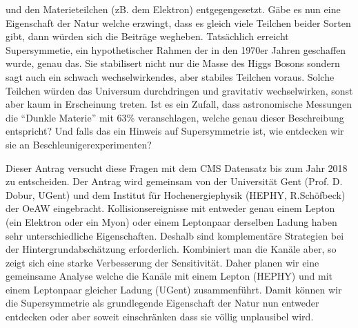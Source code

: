 \documentclass[11pt,a4paper]{article}
\begin{document}
und den Materieteilchen (zB. dem Elektron) entgegengesetzt. G\"abe es nun eine Eigenschaft der Natur welche erzwingt, dass es gleich viele Teilchen beider Sorten gibt, dann
w\"urden sich die Beitr\"age wegheben. Tats\"achlich erreicht Supersymmetie, ein hypothetischer Rahmen der in den 1970er Jahren geschaffen wurde, genau das. 
Sie stabilisert nicht nur die Masse des Higgs Bosons sondern sagt auch ein schwach wechselwirkendes, aber stabiles Teilchen voraus. Solche Teilchen w\"urden
das Universum durchdringen und gravitativ wechselwirken, sonst aber kaum in Erscheinung treten. Ist es ein Zufall, dass astronomische Messungen die ``Dunkle Materie'' mit 63\% veranschlagen,
welche genau dieser Beschreibung entspricht? Und falls das ein Hinweis auf Supersymmetrie ist, wie entdecken wir sie an Beschleunigerexperimenten?

Dieser Antrag versucht diese Fragen mit dem CMS Datensatz bis zum Jahr 2018 zu entscheiden. Der Antrag wird gemeinsam von der Universit\"at Gent (Prof. D. Dobur, UGent) und dem
Institut f\"ur Hochenergiephysik (HEPHY, R.Sch\"ofbeck) der OeAW eingebracht. Kollisionsereignisse mit entweder genau einem Lepton (ein Elektron oder ein Myon) oder
einem Leptonpaar derselben Ladung haben sehr unterschiedliche Eigenschaften. Deshalb sind komplement\"are Strategien bei der Hintergrundabsch\"atzung erforderlich.
Kombiniert man die Kan\"ale aber, so zeigt sich eine starke Verbesserung der Sensitivit\"at. Daher planen wir eine gemeinsame Analyse welche die Kan\"ale mit einem
Lepton (HEPHY) und mit einem Leptonpaar gleicher Ladung (UGent) zusammenf\"uhrt. Damit k\"onnen wir die Supersymmetrie als grundlegende Eigenschaft der Natur nun entweder entdecken oder 
aber soweit einschr\"anken dass sie v\"ollig unplausibel wird.
\end{document}
